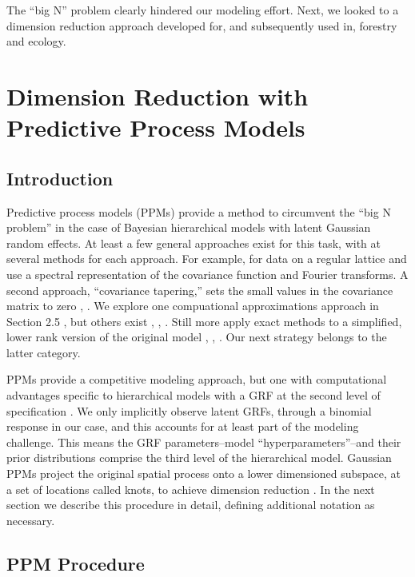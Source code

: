 The ``big N'' problem clearly hindered our modeling effort. Next, we looked to a dimension reduction approach developed for, and subsequently used in, forestry and ecology.

\section{Dimension Reduction with Predictive Process Models} %

\subsection{Introduction}

Predictive process models (PPMs) provide a method to circumvent the ``big N problem'' in the case of Bayesian hierarchical models with latent Gaussian random effects. At least a few general approaches exist for this task, with at several methods for each approach. For example, for data on a regular lattice \cite{Fuentes2007} and \citep{Paciorek2007} use a spectral representation of the covariance function and Fourier transforms. A second approach, ``covariance tapering,'' sets the small values in the covariance matrix to zero \citep{Furrer2006}, \citep{Kaufman2008}. We explore one compuational approximations approach in Section 2.5 \citep{Rue2009}, but others exist \citep{Stein2004}, \citep{Eidsvik2014}, \citep{Aune2014}. Still more apply exact methods to a simplified, lower rank version of the original model \citep{Cressie2008}, \citep{Higdon2002}, \citep{Eidsvik2012}. Our next strategy belongs to the latter category. 

PPMs provide a competitive modeling approach, but one with computational advantages specific to hierarchical models with a GRF at the second level of specification \citep{Banerjee2008}. We only implicitly observe latent GRFs, through a binomial response in our case, and this accounts for at least part of the modeling challenge. This means the GRF parameters--model ``hyperparameters''--and their prior distributions comprise the third level of the hierarchical model. Gaussian PPMs project the original spatial process onto a lower dimensioned subspace, at a set of locations called knots, to achieve dimension reduction \citep{Banerjee2008}. In the next section we describe this procedure in detail, defining additional notation as necessary.

\subsection{PPM Procedure}

